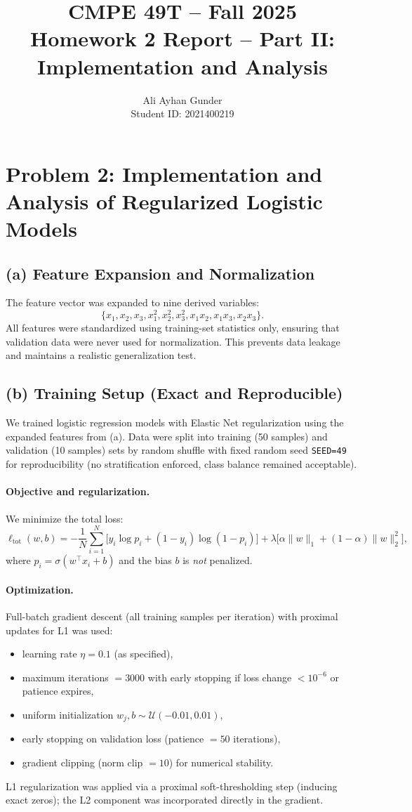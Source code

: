 \documentclass[12pt]{article}
\title{\textbf{CMPE 49T -- Fall 2025 \\ Homework 2 Report -- Part II: Implementation and Analysis}}
\author{Ali Ayhan Gunder \\ Student ID: 2021400219}
\date{}
\begin{document}
\maketitle
\tableofcontents
\newpage

\section{Problem 2: Implementation and Analysis of Regularized Logistic Models}

\subsection{(a) Feature Expansion and Normalization}
The feature vector was expanded to nine derived variables:
\[
\{x_1,x_2,x_3,x_1^2,x_2^2,x_3^2,x_1x_2,x_1x_3,x_2x_3\}.
\]
All features were standardized using training-set statistics only, ensuring that validation data were never used for normalization. This prevents data leakage and maintains a realistic generalization test.

\subsection{(b) Training Setup (Exact and Reproducible)}
We trained logistic regression models with Elastic Net regularization using the expanded features from (a).  
Data were split into training (50 samples) and validation (10 samples) sets by random shuffle with fixed random seed \texttt{SEED=49} for reproducibility (no stratification enforced, class balance remained acceptable).

\paragraph{Objective and regularization.}
We minimize the total loss:
\[
\ell_{\text{tot}}(w,b)=
-\frac{1}{N}\sum_{i=1}^N \Big[y_i\log p_i+(1-y_i)\log(1-p_i)\Big]
+\lambda\big[\alpha\|w\|_1+(1-\alpha)\|w\|_2^2\big],
\]
where $p_i=\sigma(w^\top x_i+b)$ and the bias $b$ is \emph{not} penalized.

\paragraph{Optimization.}
Full-batch gradient descent (all training samples per iteration) with proximal updates for L1 was used:
\begin{itemize}
\item learning rate $\eta=0.1$ (as specified),
\item maximum iterations $=3000$ with early stopping if loss change $<10^{-6}$ or patience expires,
\item uniform initialization $w_j,b\sim\mathcal{U}(-0.01,0.01)$,
\item early stopping on validation loss (patience $=50$ iterations),
\item gradient clipping (norm clip $=10$) for numerical stability.
\end{itemize}
L1 regularization was applied via a proximal soft-thresholding step (inducing exact zeros); the L2 component was incorporated directly in the gradient.
\end{document}
